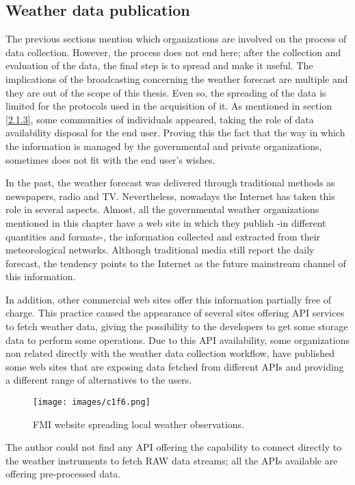 \subsection{Weather data publication}

The previous sections mention which organizations are involved on the process of data collection. However, the process does not end here; after the collection and evaluation of the data, the final step is to spread and make it useful. The implications of the broadcasting concerning the weather forecast are multiple and they are out of the scope of this thesis. Even so, the spreading of the data is limited for the protocols used in the acquisition of it. As mentioned in section \ref{2.1.3}, some communities of individuals appeared, taking the role of data availability disposal for the end user. Proving this the fact that the way in which the information is managed by the governmental and private organizations, sometimes does not fit with the end user's wishes.

In the past, the weather forecast was delivered through traditional methods as newspapers, radio and TV. Nevertheless, nowadays the Internet has taken this role in several aspects. Almost, all the governmental weather organizations mentioned in this chapter have a web site in which they publish -in different quantities and formats-, the information collected and extracted from their meteorological networks. Although traditional media still report the daily forecast, the tendency points to the Internet as the future mainstream channel of this information.

In addition, other commercial web sites offer this information partially free of charge. This practice caused the appearance of several sites offering \gls{API} services to fetch weather data, giving the possibility to the developers to get some storage data to perform some operations. Due to this \gls{API} availability, some organizations non related directly with the weather data collection workflow, have published some web sites that are exposing data fetched from different APIs and providing a different range of alternatives to the users.

\begin{figure}[H]
\centerline{\texttt{[image: images/c1f6.png]}}
\caption{\protect \gls{FMI} website \protect \cite{FMI} spreading local weather observations.}
\end{figure}

The author could not find any \gls{API} offering the capability to connect directly to the weather instruments to fetch RAW data streams; all the APIs available are offering pre-processed data. 

